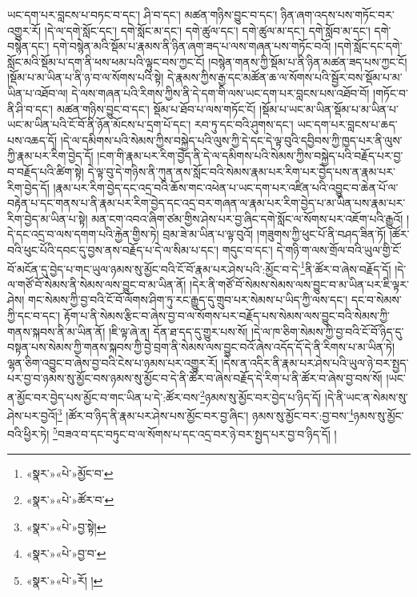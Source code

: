 ཡང་དག་པར་བླངས་པ་བཏང་བ་དང་། ཤི་བ་དང་། མཚན་གཉིས་བྱུང་བ་དང་། ཉིན་ཞག་འདས་པས་གཏོང་བར་འགྱུར་རོ། །དེ་ལ་དགེ་སློང་དང་། དགེ་སློང་མ་དང་། དགེ་ཚུལ་དང་། དགེ་ཚུལ་མ་དང་། དགེ་སློབ་མ་དང་། དགེ་བསྙེན་དང་། དགེ་བསྙེན་མའི་སྡོམ་པ་རྣམས་ནི་ཉིན་ཞག་ཟད་པ་ལས་གཞན་པས་གཏོང་བའོ། །དགེ་སློང་དང་དགེ་སློང་མའི་སྡོམ་པ་དག་ནི་ཕས་ཕམ་པའི་ལྟུང་བས་ཀྱང་ངོ། །བསྙེན་གནས་ཀྱི་སྡོམ་པ་ནི་ཉིན་མཚན་ཟད་པས་ཀྱང་ངོ། །སྡོམ་པ་མ་ཡིན་པ་ནི་ཉ་བ་ལ་སོགས་པའི་སྟེ། དེ་རྣམས་ཀྱིས་རྒྱ་དང་མཚོན་ཆ་ལ་སོགས་པའི་སྦྱོར་བས་སྡོམ་པ་མ་ཡིན་པ་འཐོབ་ལ། དེ་ལས་གཞན་པའི་རིགས་ཀྱིས་ནི་དེ་དག་གི་ལས་ཡང་དག་པར་བླངས་པས་འཐོབ་བོ། །གཏོང་བ་ནི་ཤི་བ་དང་། མཚན་གཉིས་བྱུང་བ་དང་། སྡོམ་པ་ཐོབ་པ་ལས་གཏོང་ངོ། །སྡོམ་པ་ཡང་མ་ཡིན་སྡོམ་པ་མ་ཡིན་པ་ཡང་མ་ཡིན་པའི་ངོ་བོ་ནི་ཉོན་མོངས་པ་དྲག་པོ་དང་། རབ་ཏུ་དང་བའི་ཤུགས་དང་། ཡང་དག་པར་བླངས་པ་ཆད་པས་འཆད་དོ། །དེ་ལ་དམིགས་པའི་སེམས་ཀྱིས་བསྐྱེད་པའི་ལུས་ཀྱི་དེ་དང་དེ་ལྟ་བུའི་དབྱིབས་ཀྱི་ཁྱད་པར་ནི་ལུས་ཀྱི་རྣམ་པར་རིག་བྱེད་དོ། །ངག་གི་རྣམ་པར་རིག་བྱེད་ནི་དེ་ལ་དམིགས་པའི་སེམས་ཀྱིས་བསྐྱེད་པའི་བརྗོད་པར་བྱ་བ་བརྗོད་པའི་ཚིག་སྟེ། དེ་ལྟ་བུ་དེ་གཉིས་ནི་ཀུན་ནས་སློང་བའི་སེམས་རྣམ་པར་རིག་པར་བྱེད་པས་ན་རྣམ་པར་རིག་བྱེད་དོ། །རྣམ་པར་རིག་བྱེད་དང་འདྲ་བའི་ཆོས་གང་འཕེན་པ་ཡང་དག་པར་འཛིན་པའི་འབྱུང་བ་ཆེན་པོ་ལ་བརྟེན་པ་དང་གནས་པ་ནི་རྣམ་པར་རིག་བྱེད་དང་འདྲ་བར་གཞན་ལ་རྣམ་པར་རིག་བྱེད་པ་མ་ཡིན་པས་རྣམ་པར་རིག་བྱེད་མ་ཡིན་པ་སྟེ། མན་ངག་འབའ་ཞིག་ཙམ་གྱིས་ཤེས་པར་བྱ་ཞིང་དགེ་སློང་ལ་སོགས་པར་འཇོག་པའི་རྒྱུའོ། །དེ་དང་འདྲ་བ་ལས་དགག་པའི་རྐྱེན་གྱིས་ཏེ། བྲམ་ཟེ་མ་ཡིན་པ་ལྟ་བུའོ། །གཟུགས་ཀྱི་ཕུང་པོ་ནི་བཤད་ཟིན་ཏོ། །ཚོར་བའི་ཕུང་པོའི་དབང་དུ་བྱས་ནས་བརྗོད་པ་དེ་ལ་སིམ་པ་དང་། གདུང་བ་དང་། དེ་གཉི་ག་ལས་གྲོལ་བའི་ཡུལ་གྱི་ངོ་བོ་མངོན་དུ་བྱེད་པ་གང་ཡུལ་ཉམས་སུ་མྱོང་བའི་ངོ་བོ་རྣམ་པར་ཤེས་པའི་:མྱོང་བ་དེ་\footnote{«སྣར་»«པེ་»མྱོང་བ་}ནི་ཚོར་བ་ཞེས་བརྗོད་དོ། །དེ་ལ་གཙོ་བོ་སེམས་ནི་སེམས་ལས་བྱུང་བ་མ་ཡིན་ནོ། །དེར་ནི་གཙོ་བོ་སེམས་སེམས་ལས་བྱུང་བ་མ་ཡིན་པར་ཇི་ལྟར་ཤེས། གང་སེམས་ཀྱི་བྱ་བའི་ངོ་བོ་ལོགས་ཤིག་ཏུ་རང་རྒྱུད་དུ་གྲུབ་པར་སེམས་པ་ཡིད་ཀྱི་ལས་དང་། དང་བ་སེམས་ཀྱི་དང་བ་དང་། རྟོག་པ་ནི་སེམས་རྩིང་བ་ཞེས་བྱ་བ་ལ་སོགས་པར་བརྗོད་པས་སེམས་ལས་བྱུང་བའི་སེམས་ཀྱི་གནས་སྐབས་ནི་མ་ཡིན་ནོ། །ཇི་ལྟ་ཞེ་ན། དོན་ཐ་དད་དུ་གྱུར་པས་སོ། །དེ་ལ་ཁ་ཅིག་སེམས་ཀྱི་བྱ་བའི་ངོ་བོ་ཉིད་དུ་བསྟན་པས་སེམས་ཀྱི་གནས་སྐབས་ཀྱི་བྱེ་བྲག་ནི་སེམས་ལས་བྱུང་བའོ་ཞེས་འདོད་དོ་དེ་ནི་རིགས་པ་མ་ཡིན་ཏེ། ལྷན་ཅིག་འབྱུང་བ་ཞེས་བྱ་བའི་ངེས་པ་ཉམས་པར་འགྱུར་རོ། །དེས་ན་འདིར་ནི་རྣམ་པར་ཤེས་པའི་ཡུལ་ཉེ་བར་སྤྱད་པར་བྱ་བ་ཉམས་སུ་མྱོང་བས་ཉམས་སུ་མྱོང་བ་དེ་ནི་ཚོར་བ་ཞེས་བརྗོད་དེ་རིག་པ་ནི་ཚོར་བ་ཞེས་བྱ་བས་སོ། །ཡང་ན་མྱོང་བར་བྱེད་པས་མྱོང་བ་གང་ཡིན་པ་དེ་:ཚོར་བས་\footnote{«སྣར་»«པེ་»ཚོར་བ་}ཉམས་སུ་མྱོང་བར་བྱེད་པ་ཉིད་དོ། །དེ་ནི་ཡང་ན་སེམས་སུ་ཤེས་པར་བྱའོ།\footnote{«སྣར་»«པེ་»བྱ་སྟེ།} །ཚོར་བ་ཉིད་ནི་རྣམ་པར་ཤེས་པས་མྱོང་བར་བྱ་ཞིང་། ཉམས་སུ་མྱོང་བར་:བྱ་བས་\footnote{«སྣར་»«པེ་»བྱ་བ་}ཉམས་སུ་མྱོང་བའི་ཕྱིར་ཏེ། \footnote{«སྣར་»«པེ་»རོ། ། }བཟའ་བ་དང་བཏུང་བ་ལ་སོགས་པ་དང་འདྲ་བར་ཉེ་བར་སྤྱད་པར་བྱ་བ་ཉིད་དོ། །
